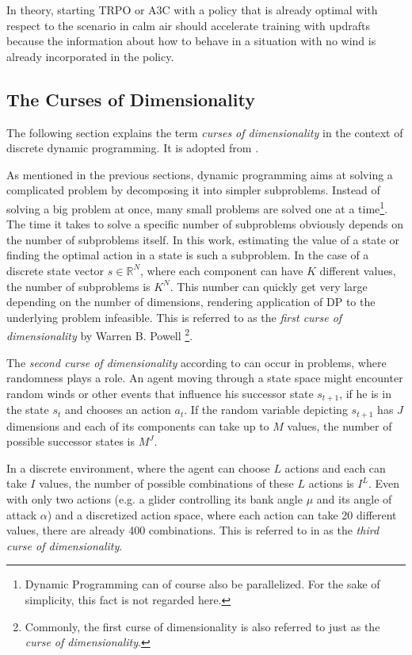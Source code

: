 In theory, starting TRPO or A3C with a policy that is already optimal with respect to the scenario in calm air should accelerate training with updrafts because the information about how to behave in a situation with no wind is already incorporated in the policy.

\subsection{The Curses of Dimensionality}
\label{sec:curses}
The following section explains the term \textit{curses of dimensionality} in the context of discrete dynamic programming. It is adopted from \cite[section~1.2]{Powell2007ADP}.\smallbreak

As mentioned in the previous sections, dynamic programming aims at solving a complicated problem by decomposing it into simpler subproblems. Instead of solving a big problem at once, many small problems are solved one at a time\footnote{Dynamic Programming can of course also be parallelized. For the sake of simplicity, this fact is not regarded here.}. The time it takes to solve a specific number of subproblems obviously depends on the number of subproblems itself. In this work, estimating the value of a state or finding the optimal action in a state is such a subproblem. In the case of a discrete state vector $s\in\mathbb{R}^N$, where each component can have $K$ different values, the number of subproblems is $K^N$. This number can quickly get very large depending on the number of dimensions, rendering application of DP to the underlying problem infeasible. This is referred to as the  \textit{first curse of dimensionality} by Warren B. Powell \cite{Powell2007ADP}\footnote{Commonly, the first curse of dimensionality is also referred to just as the \textit{curse of dimensionality}.}.\smallbreak

The \textit{second curse of dimensionality} according to \cite{Powell2007ADP} can occur in problems, where randomness plays a role. An agent moving through a state space might encounter random winds or other events that influence his successor state $s_{t+1}$, if he is in the state $s_t$ and chooses an action $a_t$. If the random variable depicting $s_{t+1}$ has $J$ dimensions and each of its components can take up to $M$ values, the number of possible successor states is $M^J$.\smallbreak

In a discrete environment, where the agent can choose $L$ actions and each can take $I$ values, the number of possible combinations of these $L$ actions is $I^L$. Even with only two actions (e.g. a glider controlling its bank angle $\mu$ and its angle of attack $\alpha$) and a discretized action space, where each action can take 20 different values, there are already 400 combinations. This is referred to in \cite{Powell2007ADP} as the \textit{third curse of dimensionality}.\smallbreak

